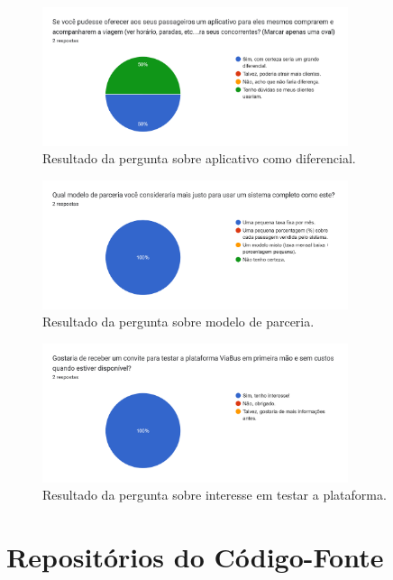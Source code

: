 \begin{apendicesenv}
  \begin{figure}[htbp]
    \centering
    \includegraphics[width=0.8\textwidth]{imagens/imagem9.png}
    \caption{Resultado da pergunta sobre aplicativo como diferencial.}
    \label{fig:resultado9}
  \end{figure}

  \begin{figure}[htbp]
    \centering
    \includegraphics[width=0.8\textwidth]{imagens/imagem10.png}
    \caption{Resultado da pergunta sobre modelo de parceria.}
    \label{fig:resultado10}
  \end{figure}

  \begin{figure}[htbp]
    \centering
    \includegraphics[width=0.8\textwidth]{imagens/imagem11.png}
    \caption{Resultado da pergunta sobre interesse em testar a plataforma.}
    \label{fig:resultado11}
  \end{figure}


  \chapter{Repositórios do Código-Fonte}
  \label{apendice:repositorios}


\end{apendicesenv}
